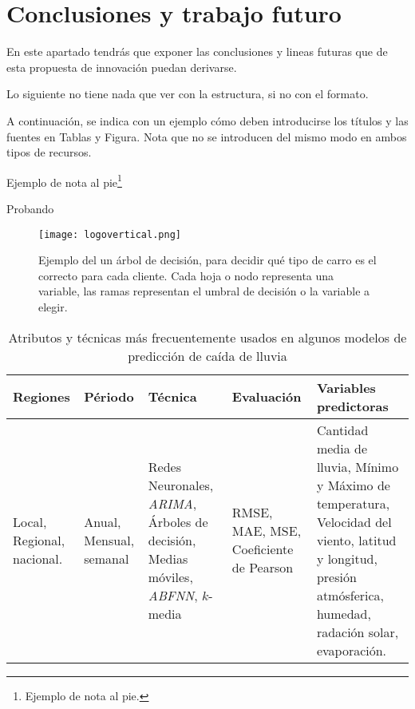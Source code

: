 \documentclass[12pt,a4paper]{proyectoinnovacion}
\begin{document}
\section{Conclusiones y trabajo futuro}

En este apartado tendrás que exponer las conclusiones y lineas futuras que de esta propuesta de innovación puedan derivarse.

Lo siguiente no tiene nada que ver con la estructura, si no con el formato. 

A continuación, se indica con un ejemplo cómo deben introducirse los títulos y las fuentes en Tablas y Figura. Nota que no se introducen del mismo modo en ambos tipos de recursos.

Ejemplo de nota al pie\footnote[1]{Ejemplo de nota al pie.}

Probando 


\begin{figure}
  \label{fig:logovertical}
  \centering
  \caption[Proceso de percepción de objetos.]{Ejemplo del un árbol de decisión, para decidir qué tipo de carro es el correcto para cada cliente. Cada hoja o nodo representa una variable, las ramas representan el umbral de decisión o la variable a elegir.}
  \texttt{[image: logovertical.png]}
\end{figure}

\begin{table}
  \label{tab:atributos}
  \caption{Atributos y técnicas más frecuentemente usados en algunos modelos de predicción de caída de lluvia}
  \centering
  \begin{tabular}{p{0.2\tablelength}p{0.2\tablelength}p{0.4\tablelength}p{0.4\tablelength}p{0.8\tablelength}}
    \toprule
    Regiones & Périodo & Técnica & Evaluación & Variables predictoras \\
    \midrule
    Local, Regional, nacional. 
    & Anual, Mensual, semanal 
    & Redes Neuronales, \textit{ARIMA}, Árboles de decisión, Medias móviles, \textit{ABFNN}, $k$-media
    & RMSE, MAE, MSE, Coeficiente de Pearson 
    & Cantidad media de lluvia, Mínimo y Máximo de temperatura, Velocidad del viento, latitud y longitud, presión atmósferica, humedad, radación solar, evaporación.\\	  
    \bottomrule
  \end{tabular}
\end{table}
\end{document}
